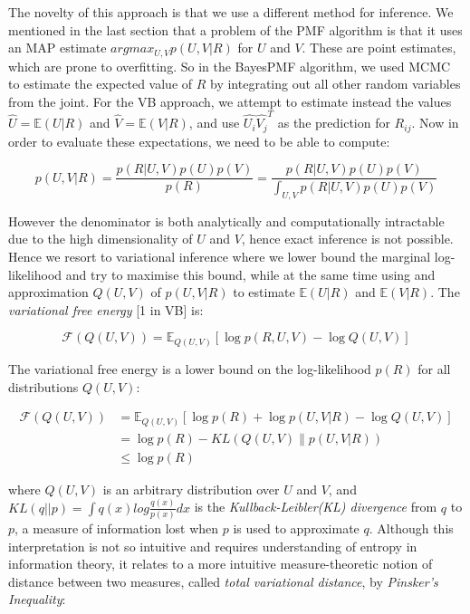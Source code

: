 \documentclass{article}
\theoremstyle{plain}
\begin{document}
The novelty of this approach is that we use a different method for inference. We mentioned in the last section that a problem of the PMF algorithm is that it uses an MAP estimate $argmax_{U,V} p(U,V|R)$ for $U$ and $V$. These are point estimates, which are prone to overfitting. So in the BayesPMF algorithm, we used MCMC to estimate the expected value of $R$ by integrating out all other random variables from the joint. For the VB approach, we attempt to estimate instead the values $\hat{U}=\mathbb{E}(U|R)$ and $\hat{V}=\mathbb{E}(V|R)$, and use $\hat{U_i} \hat{V_j}^T$ as the prediction for $R_{ij}$. Now in order to evaluate these expectations, we need to be able to compute:

\begin{equation}
p(U,V|R)=\frac{p(R|U,V)p(U)p(V)}{p(R)}=\frac{p(R|U,V)p(U)p(V)}{\int_{U,V} p(R|U,V)p(U)p(V)}
\end{equation}

However the denominator is both analytically and computationally intractable due to the high dimensionality of $U$ and $V$, hence exact inference is not possible. Hence we resort to variational inference where we lower bound the marginal log-likelihood and try to maximise this bound, while at the same time using and approximation $Q(U,V)$ of $p(U,V|R)$ to estimate $\mathbb{E}(U|R)$ and $\mathbb{E}(V|R)$. The \textit{variational free energy} [1 in VB] is:

\begin{equation}
\mathcal{F}(Q(U,V))=\mathbb{E}_{Q(U,V)}[\log p(R,U,V) - \log Q(U,V)]
\end{equation}

The variational free energy is a lower bound on the log-likelihood $p(R)$ for all distributions $Q(U,V)$:

\begin{equation}
\begin{split}
\mathcal{F}(Q(U,V)) & = \mathbb{E}_{Q(U,V)}[\log p(R) + \log p(U,V|R) - \log Q(U,V)] \\ & = \log p(R) - KL(Q(U,V)\|p(U,V|R)) \\
& \leq \log p(R)
\end{split}
\end{equation}

where $Q(U,V)$ is an arbitrary distribution over $U$ and $V$, and $KL(q||p)=\int q(x)log\frac{q(x)}{p(x)}dx$ is the \textit{Kullback-Leibler(KL) divergence} from $q$ to $p$, a measure of information lost when $p$ is used to approximate $q$. Although this interpretation is not so intuitive and requires understanding of entropy in information theory, it relates to a more intuitive measure-theoretic notion of distance between two measures, called \textit{total variational distance}, by \textit{Pinsker's Inequality}:
\end{document}
